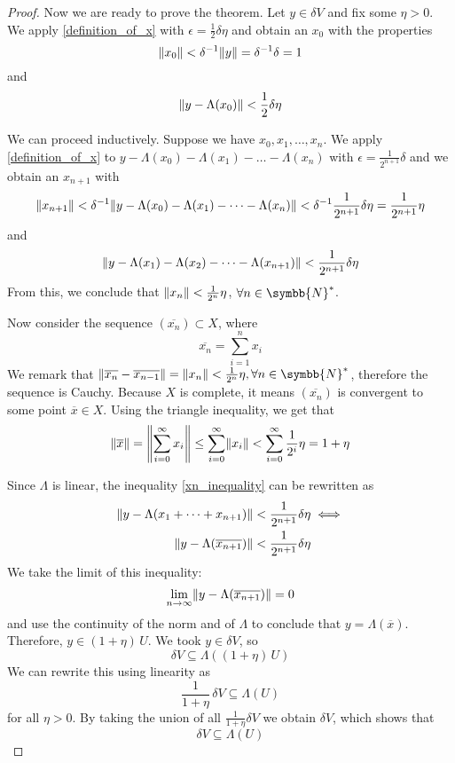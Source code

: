 \documentclass[a4paper, 12pt]{article}
\theoremstyle{definition}
\newcommand{\naturals}{\symbb{N}}
\DeclarePairedDelimiter{\norm}{\lVert}{\rVert}
\begin{document}
\begin{proof}
Now we are ready to prove the theorem. Let \(y \in \delta V\) and fix some \(\eta > 0\). We apply \ref{definition_of_x} with \(\epsilon = \frac{1}{2} \delta \eta\) and obtain an \(x_0\) with the properties
\[
    \norm{x_0} < \delta^{-1} \norm{y} = \delta^{-1} \delta = 1
\]
and
\[
    \norm{y - \Lambda(x_0)} < \frac{1}{2} \delta \eta
\]

We can proceed inductively. Suppose we have \(x_0, x_1, \dots, x_n\). We apply \ref{definition_of_x} to \(y - \Lambda(x_0) - \Lambda(x_1) - \dots - \Lambda(x_n)\) with \(\epsilon = \frac{1}{2^{n + 1}} \delta\) and we obtain an \(x_{n + 1}\) with
\[
    \norm{x_{n + 1}} < \delta^{-1} \norm{y - \Lambda(x_0) - \Lambda(x_1) - \dots - \Lambda(x_n) } < \delta^{-1} \frac{1}{2^{n + 1}} \delta \eta = \frac{1}{2^{n + 1}} \eta
\]
and
\begin{equation} \label{xn_inequality}
    \norm{y - \Lambda(x_1) - \Lambda(x_2) - \dots - \Lambda(x_{n + 1})} < \frac{1}{2^{n + 1}} \delta \eta
\end{equation}
From this, we conclude that \(\norm{x_n} < \frac{1}{2^n} \eta\), \(\forall n \in \naturals^*\).

Now consider the sequence \((\overline{x_n}) \subset X\), where
\[
    \overline{x_n} = \sum_{i = 1}^{n} x_i
\]
We remark that \(\norm{\overline{x_n} - \overline{x_{n - 1}}} = \norm{x_n} < \frac{1}{2^n} \eta, \forall n \in \naturals^*\), therefore the sequence is Cauchy. Because \(X\) is complete, it means \((\overline{x_n})\) is convergent to some point \(\overline{x} \in X\). Using the triangle inequality, we get that
\begin{equation} \label{bound_on_x_bar}
    \norm{\overline{x}} = \norm*{\sum_{i=0}^{\infty} x_i}
    \leq \sum_{i=0}^{\infty} \norm*{x_i} < \sum_{i=0}^{\infty} \frac{1}{2^i} \eta = 1 + \eta
\end{equation}

Since \(\Lambda\) is linear, the inequality \ref{xn_inequality} can be rewritten as
\begin{align*}
    \norm{y - \Lambda(x_1 + \dots + x_{n+1})} &< \frac{1}{2^{n+1}} \delta \eta \iff \\
    \norm{y - \Lambda(\overline{x_{n+1}})} &< \frac{1}{2^{n+1}} \delta \eta
\end{align*}
We take the limit of this inequality:
\[
    \lim_{n\to\infty} \norm{y - \Lambda(\overline{x_{n+1}})} = 0
\]
and use the continuity of the norm and of \(\Lambda\) to conclude that \(y = \Lambda(\overline{x})\). Therefore, \(y \in (1 + \eta) \, U\). We took \(y \in \delta V\), so
\[
    \delta V \subseteq \Lambda((1 + \eta) \, U)
\]
We can rewrite this using linearity as
\[
    \frac{1}{1 + \eta} \, \delta V \subseteq \Lambda(U)
\]
for all \(\eta > 0\). By taking the union of all \(\frac{1}{1 + \eta} \delta V\) we obtain \(\delta V\), which shows that
\[
    \delta V \subseteq \Lambda(U)
\]
\end{proof}
\end{document}
